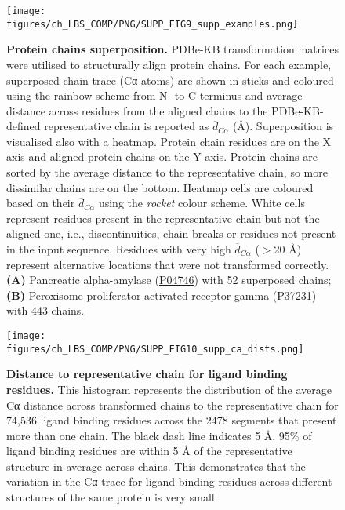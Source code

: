 \begin{figure}[htb!]
    \centering
    \texttt{[image: figures/ch\_LBS\_COMP/PNG/SUPP\_FIG9\_supp\_examples.png]}
    \caption[Protein chains superposition]{\textbf{Protein chains superposition.} PDBe-KB transformation matrices were utilised to structurally align protein chains. For each example, superposed chain trace (Cα atoms) are shown in sticks and coloured using the rainbow scheme from N- to C-terminus and average distance across residues from the aligned chains to the PDBe-KB-defined representative chain is reported as $\overline{d}_{C\alpha}$ (\AA{}). Superposition is visualised also with a heatmap. Protein chain residues are on the X axis and aligned protein chains on the Y axis. Protein chains are sorted by the average distance to the representative chain, so more dissimilar chains are on the bottom. Heatmap cells are coloured based on their $\overline{d}_{C\alpha}$ using the \textit{rocket} colour scheme. White cells represent residues present in the representative chain but not the aligned one, i.e., discontinuities, chain breaks or residues not present in the input sequence. Residues with very high $\overline{d}_{C\alpha}$  ($>$20 \AA{}) represent alternative locations that were not transformed correctly. \textbf{(A)} Pancreatic alpha-amylase (\href{https://www.uniprot.org/uniprotkb/P04746/entry}{P04746}) with 52 superposed chains; \textbf{(B)} Peroxisome proliferator-activated receptor gamma (\href{https://www.uniprot.org/uniprotkb/P37231/entry}{P37231}) with 443 chains.}
    \label{fig:protein_chain_supp}
\end{figure}

\begin{figure}[htb!]
    \centering
    \texttt{[image: figures/ch\_LBS\_COMP/PNG/SUPP\_FIG10\_supp\_ca\_dists.png]}
    \caption[Distance to representative chain for ligand binding residues]{\textbf{Distance to representative chain for ligand binding residues.} This histogram represents the distribution of the average Cα distance across transformed chains to the representative chain for 74,536 ligand binding residues across the 2478 segments that present more than one chain. The black dash line indicates 5 \AA{}. 95\% of ligand binding residues are within 5 \AA{} of the representative structure in average across chains. This demonstrates that the variation in the Cα trace for ligand binding residues across different structures of the same protein is very small.}
    \label{fig:supp_ca_dists}
\end{figure}

